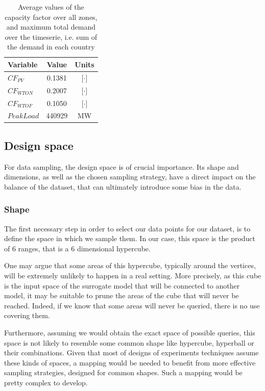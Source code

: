 \begin{table}[h]
    \centering
    \begin{tabular}{|l c c|}
        \hline
        Variable     & Value  & Units \\ \hline
        $CF_{PV}$    & 0.1381 & [$\cdot$]    \\
        $CF_{WTON}$  & 0.2007 & [$\cdot$]    \\
        $CF_{WTOF}$  & 0.1050 & [$\cdot$]    \\ 
        $PeakLoad$   & 440929 & MW    \\ \hline
    \end{tabular}
    \caption{Average values of the capacity factor over all zones, and maximum total demand over the timeserie, i.e. sum of the demand in each country}
    \label{table:param-values}
\end{table}

\subsection{Design space}

For data sampling, the design space is of crucial importance. Its shape and dimensions, as well as the chosen sampling strategy, have a direct impact on the balance of the dataset, that can ultimately introduce some bias in the data. 

\subsubsection{Shape}

The first necessary step in order to select our data points for our dataset, is to define the space in which we sample them. In our case, this space is the product of 6 ranges, that is a 6 dimensional hypercube. 

One may argue that some areas of this hypercube, typically around the vertices, will be extremely unlikely to happen in a real setting. More precisely, as this cube is the input space of the surrogate model that will be connected to another model, it may be suitable to prune the areas of the cube that will never be reached. Indeed, if we know that some areas will never be queried, there is no use covering them.

Furthermore, assuming we would obtain the exact space of possible queries, this space is not likely to resemble some common shape like hypercube, hyperball or their combinations. Given that most of designs of experiments techniques assume these kinds of spaces, a mapping would be needed to benefit from more effective sampling strategies, designed for common shapes. Such a mapping would be pretty complex to develop.

